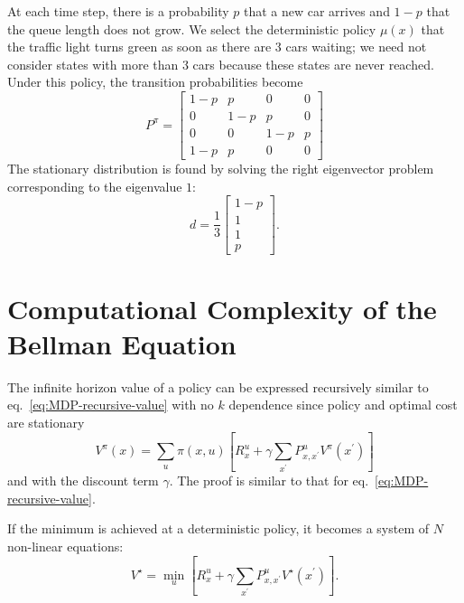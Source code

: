 At each time step, there is a probability $p$ that a new car arrives and $1-p$ that the queue length does not grow. We select the deterministic policy $\mu(x)$ that the traffic light turns green as soon as there are 3 cars waiting; we need not consider states with more than 3 cars because these states are never reached. Under this policy, the transition probabilities become
\begin{equation*}
  P^\pi =
  \begin{bmatrix}
    1-p & p & 0 & 0 \\
    0 & 1-p & p & 0 \\
    0 & 0 & 1-p & p \\
    1-p & p & 0 & 0
  \end{bmatrix}
\end{equation*}
The stationary distribution is found by solving the right eigenvector problem corresponding to the eigenvalue $1$:
\begin{equation*}
  d =
  \frac{1}{3}\begin{bmatrix}
               1-p \\ 1 \\ 1 \\ p
  \end{bmatrix}.
\end{equation*}

\section{Computational Complexity of the Bellman Equation}
\label{sec:MDP-computation-complexity-bellman-eq}

The infinite horizon value of a policy can be expressed recursively similar to eq.~\eqref{eq:MDP-recursive-value} with no $k$ dependence since policy and optimal cost are stationary
\begin{equation}
  \label{eq:MDP-recursive-value-infinite-horizon}
  V^\pi(x) = \sum_u \pi(x,u)\left[R^u_x + \gamma \sum_{x^\prime}P^u_{x,x^\prime} V^\pi(x^\prime)\right]
\end{equation}
and with the discount term $\gamma$. The proof is similar to that for eq.~\eqref{eq:MDP-recursive-value}.

If the minimum is achieved at a deterministic policy, it becomes a system of $N$ non-linear equations:
\begin{equation*}
  V^\star = \min_u \left[R^u_x + \gamma \sum_{x^\prime}P^u_{x,x^\prime} V^\star(x^\prime)\right].
\end{equation*}

